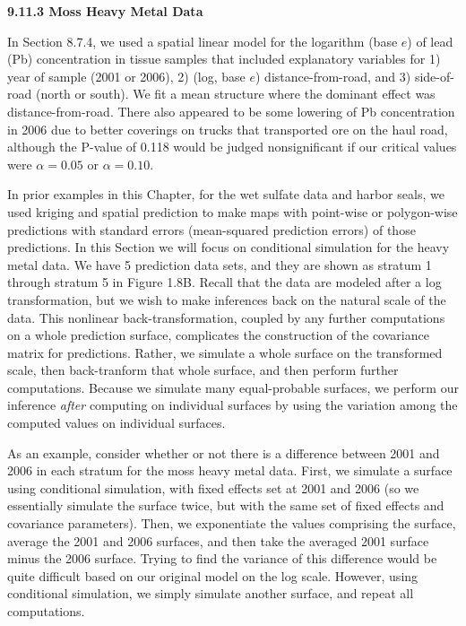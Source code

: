 \documentclass[12pt, titlepage]{article}
\begin{document}
\setcounter{equation}{0}
\renewcommand{\theequation}{R.\arabic{equation}}


%
%

{\large \flushleft \textbf{9.11.3 Moss Heavy Metal Data}}

\vspace{.3cm}

In Section 8.7.4, we used a spatial linear model for the logarithm (base $e$) of lead (Pb) concentration in tissue samples that included explanatory variables for 1) year of sample (2001 or 2006), 2) (log, base $e$) distance-from-road, and 3) side-of-road (north or south).  We fit a mean structure where the dominant effect was distance-from-road. There also appeared to be some lowering of Pb concentration in 2006 due to better coverings on trucks that transported ore on the haul road, although the P-value of 0.118 would be judged nonsignificant if our critical values were $\alpha = 0.05$ or $\alpha = 0.10$. 

In prior examples in this Chapter, for the wet sulfate data and harbor seals, we used kriging and spatial prediction to make maps with point-wise or polygon-wise predictions with standard errors (mean-squared prediction errors) of those predictions.  In this Section we will focus on conditional simulation for the heavy metal data.  We have 5 prediction data sets, and they are shown as stratum 1 through stratum 5 in Figure 1.8B.  Recall that the data are modeled after a log transformation, but we wish to make inferences back on the natural scale of the data.  This nonlinear back-transformation, coupled by any further computations on a whole prediction surface, complicates the construction of the covariance matrix for predictions.  Rather, we simulate a whole surface on the transformed scale, then back-tranform that whole surface, and then perform further computations.  Because we simulate many equal-probable surfaces, we perform our inference \textit{after} computing on individual surfaces by using the variation among the computed values on individual surfaces.

As an example, consider whether or not there is a difference between 2001 and 2006 in each stratum for the moss heavy metal data.  First, we simulate a surface using conditional simulation, with fixed effects set at 2001 and 2006 (so we essentially simulate the surface twice, but with the same set of fixed effects and covariance parameters).  Then, we exponentiate the values comprising the surface, average the 2001 and 2006 surfaces, and then take the averaged 2001 surface minus the 2006 surface.  Trying to find the variance of this difference would be quite difficult based on our original model on the log scale.  However, using conditional simulation, we simply simulate another surface, and repeat all computations.  
\end{document}
